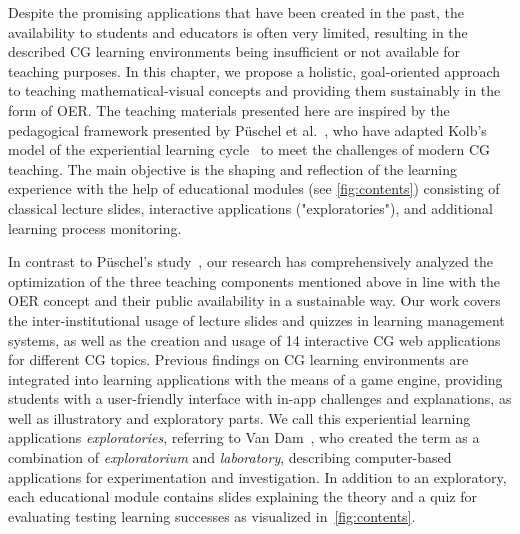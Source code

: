 Despite the promising applications that have been created in the past, the availability to students and educators is often very limited, resulting in the described CG learning environments being insufficient or not available for teaching purposes. In this chapter, we propose a holistic, goal-oriented approach to teaching mathematical-visual concepts and providing them sustainably in the form of OER. The teaching materials presented here are inspired by the pedagogical framework presented by Püschel et al.~\cite{pueschel:2013:MRCG}, who have adapted Kolb's model of the experiential learning cycle~\cite{kolb:1984:experiential} to meet the challenges of modern CG teaching. The main objective is the shaping and reflection of the learning experience with the help of educational modules (see \autoref{fig:contents}) consisting of classical lecture slides, interactive applications ("exploratories"), and additional learning process monitoring.

In contrast to Püschel's study~\cite{pueschel:2013:MRCG}, our research has comprehensively analyzed the optimization of the three teaching components mentioned above in line with the OER concept and their public availability in a sustainable way. Our work covers the inter-institutional usage of lecture slides and quizzes in learning management systems, as well as the creation and usage of 14 interactive CG web applications for different CG topics. Previous findings on CG learning environments are integrated into learning applications with the means of a game engine, providing students with a user-friendly interface with in-app challenges and explanations, as well as illustratory and exploratory parts. We call this experiential learning applications \emph{exploratories}, referring to Van Dam~\cite{vanDam:1999:education}, who created the term as a combination of \emph{exploratorium} and \emph{laboratory}, describing computer-based applications for experimentation and investigation. In addition to an exploratory, each educational module contains slides explaining the theory and a quiz for evaluating testing learning successes as visualized in~\autoref{fig:contents}.

